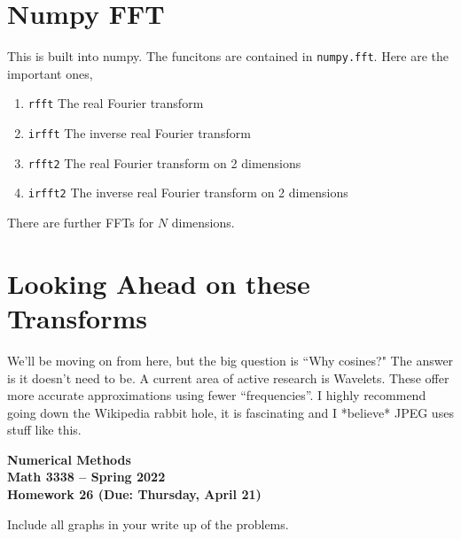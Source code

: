 \documentclass[11pt,letterpaper]{article}
\newcommand{\semester}{Spring 2022}
\newcommand{\due}{Thursday, April 21}
\begin{document}
\section{Numpy FFT}
This is built into numpy. The funcitons are contained in \texttt{numpy.fft}. Here are the important
ones,
\begin{enumerate}
 \item \texttt{rfft} The real Fourier transform
 \item \texttt{irfft} The inverse real Fourier transform
 \item \texttt{rfft2} The real Fourier transform on 2 dimensions
 \item \texttt{irfft2} The inverse real Fourier transform on 2 dimensions
\end{enumerate}
There are further FFTs for $N$ dimensions.

\section{Looking Ahead on these Transforms}
We'll be moving on from here, but the big question is ``Why cosines?" The answer is it doesn't need
to be. A current area of active research is Wavelets. These offer more accurate approximations using
fewer ``frequencies''. I highly recommend going down the Wikipedia rabbit hole, it is fascinating
and I *believe* JPEG uses stuff like this.






\newpage

\begin{center}
{\huge{\bf  Numerical Methods}} \\[1.5ex]
{\bf Math 3338 -- \semester}\\[1.5ex]
{\Large{\bf Homework 26 (Due: \due)}}\\
\end{center}
\vspace{2mm}

Include all graphs in your write up of the problems.
\end{document}
